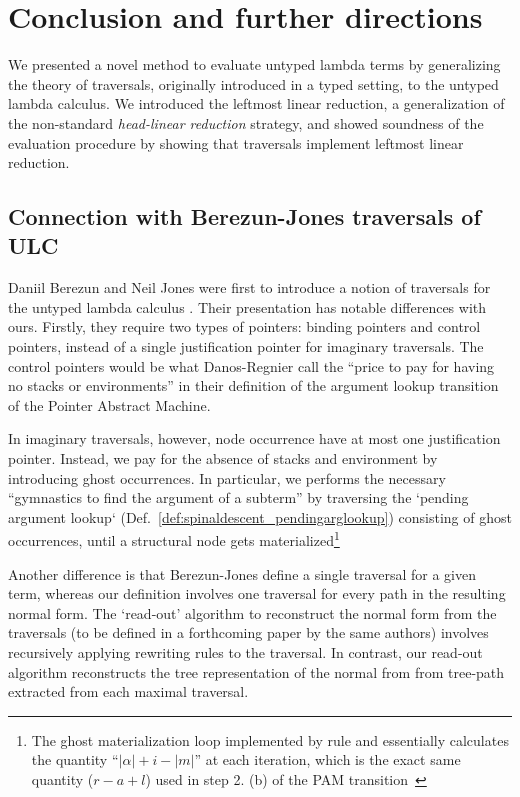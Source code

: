 \documentclass{elsarticle}
\theoremstyle{plain}
\theoremstyle{definition}
\theoremstyle{remark}
\newcommand{\ghostlmd}{{\lambda\!\!\lambda}}
\begin{document}
\section{Conclusion and further directions}

We presented a novel method to evaluate untyped lambda terms by generalizing the theory of traversals, originally introduced in a typed setting, to the untyped lambda calculus. We introduced the leftmost linear reduction, a generalization of the non-standard \emph{head-linear reduction} strategy\cite{danos-head}, and showed soundness of the evaluation procedure by showing that traversals implement leftmost linear reduction.

\subsection*{Connection with Berezun-Jones traversals of ULC}

Daniil Berezun and Neil Jones were first to introduce a notion of traversals for the untyped lambda calculus \cite{JonesBerezunLLL}. Their presentation has notable differences with ours. Firstly, they require two types of pointers: binding pointers and control pointers, instead of a single justification pointer for imaginary traversals.
The control pointers would be what Danos-Regnier call the ``price to pay for having no stacks or environments'' in their definition of the argument lookup transition of the Pointer Abstract Machine\cite{danos-head}.

In imaginary traversals, however, node occurrence have at most one justification pointer. Instead, we pay for the absence of stacks and environment by introducing ghost occurrences. In particular,
we performs the necessary ``gymnastics to find the argument of a subterm''\cite{danos-head} by traversing the `pending argument lookup` (Def.~\ref{def:spinaldescent_pendingarglookup}) consisting of ghost occurrences, until
a structural node gets materialized\footnote{The ghost materialization loop  implemented by
rule \rulenamet{Lam^\ghostlmd} and  essentially calculates the quantity ``$|\alpha|+i-|m|$'' at each iteration, which is the exact same quantity ($r-a+l$) used in step 2. (b) of the PAM transition~\cite{danos-head}}

Another difference is that Berezun-Jones define a single traversal for a given term, whereas our definition involves one traversal for every path in the resulting normal form. The `read-out' algorithm to reconstruct the normal form from the traversals (to be defined in a forthcoming paper by the same authors) involves recursively applying rewriting rules to the traversal. In contrast, our read-out algorithm reconstructs the tree representation of the normal from from tree-path extracted from each maximal traversal.
\end{document}
